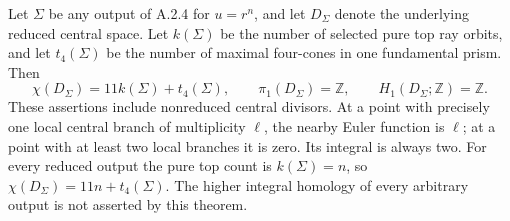 \begin{theorem}\label{push:A47}
Let $\Sigma$ be any output of A.2.4 for $u=r^n$, and let
$D_\Sigma$ denote the underlying reduced central space.
Let $k(\Sigma)$ be the number of selected pure top ray
orbits, and let $t_4(\Sigma)$ be the number of maximal
four-cones in one fundamental prism. Then
\[
 \chi(D_\Sigma)=11k(\Sigma)+t_4(\Sigma),
 \qquad \pi_1(D_\Sigma)=\mathbb Z,
 \qquad H_1(D_\Sigma;\mathbb Z)=\mathbb Z.
\]
These assertions include nonreduced central divisors.
At a point with precisely one local central branch of
multiplicity $\ell$, the nearby Euler function is $\ell$;
at a point with at least two local branches it is zero.
Its integral is always two. For every reduced output the
pure top count is $k(\Sigma)=n$, so
$\chi(D_\Sigma)=11n+t_4(\Sigma)$.
The higher integral homology of every arbitrary output is
not asserted by this theorem.
\end{theorem}
